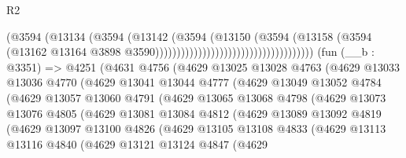 \begin{lexlean}{R2}
\begin{coremodule}
                                                          (@3594
                                                            (@13134
                                                              (@3594
                                                                (@13142
                                                                  (@3594
                                                                    (@13150
                                                                      (@3594
                                                                        (@13158
                                                                          (@3594
                                                                            (@13162
                                                                              @13164
                                                                              @3898
                                                                              @3590)))))))))))))))))))))))))))))))))))))
    (fun (__b : @3351) =>
    @4251
      (@4631
        @4756
        (@4629
          @13025
          @13028
          @4763
          (@4629
            @13033
            @13036
            @4770
            (@4629
              @13041
              @13044
              @4777
              (@4629
                @13049
                @13052
                @4784
                (@4629
                  @13057
                  @13060
                  @4791
                  (@4629
                    @13065
                    @13068
                    @4798
                    (@4629
                      @13073
                      @13076
                      @4805
                      (@4629
                        @13081
                        @13084
                        @4812
                        (@4629
                          @13089
                          @13092
                          @4819
                          (@4629
                            @13097
                            @13100
                            @4826
                            (@4629
                              @13105
                              @13108
                              @4833
                              (@4629
                                @13113
                                @13116
                                @4840
                                (@4629
                                  @13121
                                  @13124
                                  @4847
                                  (@4629

\end{coremodule}
\end{lexlean}
